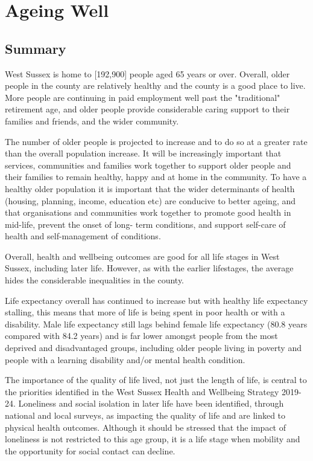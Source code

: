 \section{Ageing Well}
\subsection{Summary}

West Sussex is home to [192,900] people aged 65 years or over. Overall, older people in the county are relatively healthy and the county is a good place to live. More people are continuing in paid employment well past the "traditional" retirement age, and older people provide considerable caring support to their families and friends, and the wider community.

The number of older people is projected to increase and to do so at a greater rate than the overall population increase. It will be increasingly important that services, communities and families work together to support older people and their families to remain healthy, happy and at home in the community. To have a healthy older population it is important that the wider determinants of health (housing, planning, income, education etc) are conducive to better ageing, and that organisations and communities work together to promote good health in mid-life, prevent the onset of long- term conditions, and support self-care of health and self-management of conditions.

Overall, health and wellbeing outcomes are good for all life stages in West Sussex, including later life. However, as with the earlier lifestages, the average hides the considerable inequalities in the county.

Life expectancy overall has continued to increase but with healthy life expectancy stalling, this means that more of life is being spent in poor health or with a disability. Male life expectancy still lags behind female life expectancy (80.8 years compared with 84.2 years) and is far lower amongst people from the most deprived and disadvantaged groups, including older people living in poverty and people with a learning disability and/or mental health condition.

The importance of the quality of life lived, not just the length of life, is central to the priorities identified in the West Sussex Health and Wellbeing Strategy 2019-24. Loneliness and social isolation in later life have been identified, through national and local surveys, as impacting the quality of life and are linked to physical health outcomes. Although it should be stressed that the impact of loneliness is not restricted to this age group, it is a life stage when mobility and the opportunity for social contact can decline.

